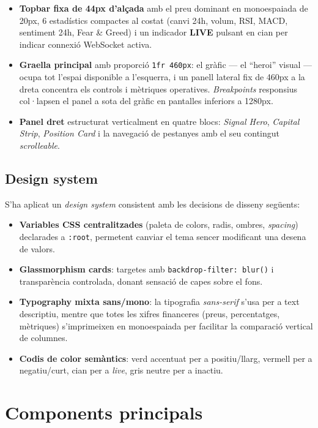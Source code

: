 \documentclass[12pt, a4paper]{report}
\begin{document}
\begin{itemize}
  \item \textbf{Topbar fixa de 44px d'alçada} amb el preu dominant en monoespaiada de 20px, 6 estadístics compactes al costat (canvi 24h, volum, RSI, MACD, sentiment 24h, Fear \& Greed) i un indicador \textbf{LIVE} pulsant en cian per indicar connexió WebSocket activa.
  \item \textbf{Graella principal} amb proporció \texttt{1fr 460px}: el gràfic --- el ``heroi'' visual --- ocupa tot l'espai disponible a l'esquerra, i un panell lateral fix de 460px a la dreta concentra els controls i mètriques operatives. \textit{Breakpoints} responsius col·lapsen el panel a sota del gràfic en pantalles inferiors a 1280px.
  \item \textbf{Panel dret} estructurat verticalment en quatre blocs: \textit{Signal Hero}, \textit{Capital Strip}, \textit{Position Card} i la navegació de pestanyes amb el seu contingut \textit{scrolleable}.
\end{itemize}

\subsection{Design system}

S'ha aplicat un \textit{design system} consistent amb les decisions de disseny següents:

\begin{itemize}
  \item \textbf{Variables CSS centralitzades} (paleta de colors, radis, ombres, \textit{spacing}) declarades a \texttt{:root}, permetent canviar el tema sencer modificant una desena de valors.
  \item \textbf{Glassmorphism cards}: targetes amb \texttt{backdrop-filter: blur()} i transparència controlada, donant sensació de capes sobre el fons.
  \item \textbf{Typography mixta sans/mono}: la tipografia \textit{sans-serif} s'usa per a text descriptiu, mentre que totes les xifres financeres (preus, percentatges, mètriques) s'imprimeixen en monoespaiada per facilitar la comparació vertical de columnes.
  \item \textbf{Codis de color semàntics}: verd accentuat per a positiu/llarg, vermell per a negatiu/curt, cian per a \textit{live}, gris neutre per a inactiu.
\end{itemize}

\section{Components principals}
\end{document}
